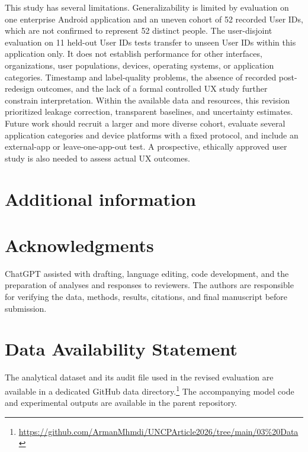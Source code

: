 \documentclass[sn-mathphys-num, Numbered]{sn-jnl}%
\theoremstyle{thmstyleone}%
\theoremstyle{thmstyletwo}%
\theoremstyle{thmstylethree}%
\begin{document}
This study has several limitations. Generalizability is limited by evaluation on one enterprise Android application and an uneven cohort of 52 recorded User IDs, which are not confirmed to represent 52 distinct people. The user-disjoint evaluation on 11 held-out User IDs tests transfer to unseen User IDs within this application only. It does not establish performance for other interfaces, organizations, user populations, devices, operating systems, or application categories. Timestamp and label-quality problems, the absence of recorded post-redesign outcomes, and the lack of a formal controlled UX study further constrain interpretation. Within the available data and resources, this revision prioritized leakage correction, transparent baselines, and uncertainty estimates. Future work should recruit a larger and more diverse cohort, evaluate several application categories and device platforms with a fixed protocol, and include an external-app or leave-one-app-out test. A prospective, ethically approved user study is also needed to assess actual UX outcomes.


\section*{Additional information}

\section*{Acknowledgments}
ChatGPT assisted with drafting, language editing, code development, and the preparation of analyses and responses to reviewers. The authors are responsible for verifying the data, methods, results, citations, and final manuscript before submission.

\section*{Data Availability Statement}
The analytical dataset and its audit file used in the revised evaluation are available in a dedicated GitHub data directory.\footnote{\url{https://github.com/ArmanMhmdi/UNCPArticle2026/tree/main/03\%20Data}} The accompanying model code and experimental outputs are available in the parent repository.
\end{document}
